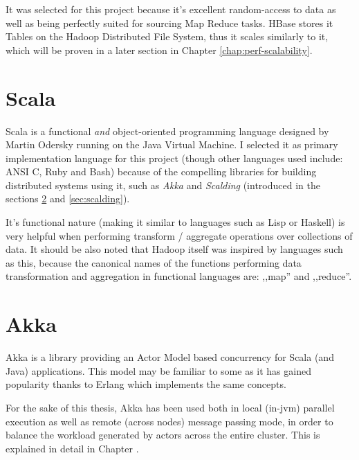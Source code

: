 It was selected for this project because it's excellent random-access to data as well as being perfectly suited for sourcing Map Reduce tasks.
HBase stores it Tables on the Hadoop Distributed File System, thus it scales similarly to it, which will be proven in a later section in Chapter \ref{chap:perf-scalability}.

\section{Scala}
\label{sec:scala}
Scala is a functional \textit{and} object-oriented programming language designed by Martin Odersky \cite{scala} running on the Java Virtual Machine.
I selected it as primary implementation language for this project (though other languages used include: ANSI C, Ruby and Bash) because of the compelling 
libraries for building distributed systems using it, such as \textit{Akka} and \textit{Scalding} (introduced in the sections \ref{sec:akka} and \ref{sec:scalding}).

It's functional nature (making it similar to languages such as Lisp or Haskell) is very helpful when performing transform / aggregate operations over collections of data. It should be also noted that Hadoop itself was inspired by languages such as this, because the canonical names of the functions 
performing data transformation and aggregation in functional languages are: ,,map'' and ,,reduce''.

\section{Akka}
\label{sec:akka}

Akka is a library providing an Actor Model \cite{actor-model} based concurrency for Scala (and Java) applications. 
This model may be familiar to some as it has gained popularity thanks to Erlang \cite{erlang} which implements the same concepts.

For the sake of this thesis, Akka has been used both in local (in-jvm) parallel execution as well as remote (across nodes) message passing mode,
in order to balance the workload generated by actors across the entire cluster. This is explained in detail in Chapter .

